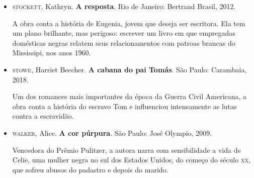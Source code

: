 \documentclass[11pt]{extarticle}
\begin{document}
\begin{itemize}
\item\textsc{stockett}, Kathryn. \textbf{A resposta}. Rio de Janeiro: Bertrand
  Brasil, 2012.

A obra conta a história de Eugenia, jovem que deseja ser escritora. Ela
tem um plano brilhante, mas perigoso: escrever um livro em que
empregadas domésticas negras relatem seus relacionamentos com patroas
brancas do Mississipi, nos anos 1960.

\item\textsc{stowe}, Harriet Beecher. \textbf{A cabana do pai Tomás}. São Paulo:
  Carambaia, 2018.

Um dos romances mais importantes da época da Guerra Civil Americana, a
obra conta a história do escravo Tom e influenciou intensamente as lutas
contra a escravidão.

\item\textsc{walker}, Alice. \textbf{A cor púrpura}. São Paulo: José Olympio, 2009.

Vencedora do Prêmio Pulitzer, a autora narra com sensibilidade a vida de
Celie, uma mulher negra no sul dos Estados Unidos, do começo do século
\textsc{xx}, que sofreu abusos do padastro e depois do marido.
\end{itemize}
\end{document}
